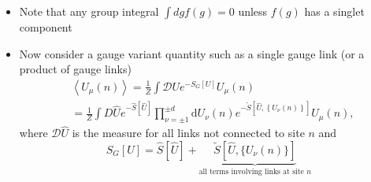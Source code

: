 \begin{itemize}
\begin{itemize}
      \begin{equation}
          \int \text{d} U  U= \int \text{D}(UV) U = \int \text{d}U U V^\dagger = \int \text{d}(W^\dagger U^\prime) U^\prime V^\dagger = \int \text{d}U^{\prime \prime} W U^{\prime \prime}V^\dagger = W \left[ \int \text{d} U U\right] V^\dagger
      \end{equation}
      which holds for all $W$ and $V^\dagger$, implying $\int \text{d}U U = 0$.
      \item Note that any group integral $\int dg f(g)=0$ unless $f(g)$ has a singlet component
      \item Now consider a gauge variant quantity such as a single gauge link (or a product of gauge links)
      \begin{equation}
        \begin{aligned}
        & \left\langle U_{\mu}(n)\right\rangle=\frac{1}{Z} \int \mathcal{D} U e^{-S_{G}[U]} U_{\mu}(n) \\
        & =\frac{1}{Z} \int D \hat{U} e^{-\hat{S}[\hat{U}]} \prod_{\nu= \pm1}^{ \pm d} \text{d} U_{\nu}(n) e^{-\tilde{S}\left[\hat{U},\left\{U_{\nu}(n)\right\}\right]} U_{\mu}(n),
        \end{aligned}
        \end{equation}
        where $\mathcal{D}\hat{U}$ is the measure for all links not connected to site $n$ and $$S_G[U] = \hat S[\hat{U}] +  \underset{\text{all terms involving links at site $n$}}{\underbrace{\tilde{S}[\hat{U}, \{ U_\nu(n)\}]}}$$


\end{itemize}
\end{itemize}

